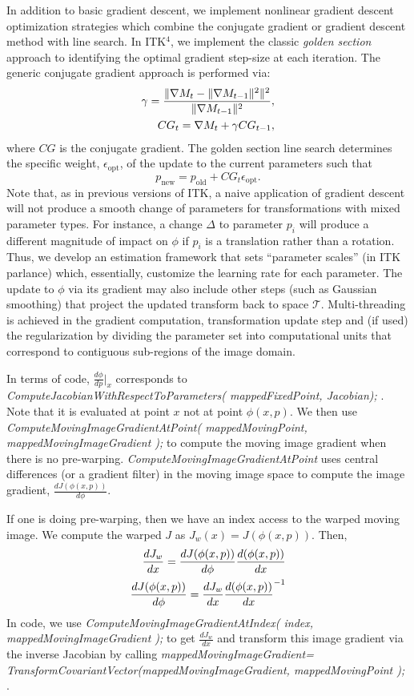 \documentclass{frontiersSCNS}
\begin{document}
In addition to basic gradient descent, we implement nonlinear gradient
descent optimization strategies which combine the conjugate gradient
or gradient descent method with line search.  In ITK$^4$, we implement the classic {\em
  golden section} approach to identifying the optimal gradient
step-size at each iteration.  The generic conjugate gradient approach
is performed via: 
\begin{align}
\gamma=\frac{\|\nabla M_{t}-\|\nabla M_{t-1}\|^2\|^2}{\|\nabla
  M_{t-1}\|^2}, \\ \notag
CG_t = \nabla M_t + \gamma CG_{t-1},
\end{align}
where $CG$ is the conjugate gradient.  The golden section line search
determines the specific weight, $\epsilon_\text{opt}$, of the update to the current parameters
such that 
$$ 
p_{\text{new}}=p_{\text{old}}+CG_t \epsilon_\text{opt}.
$$
Note that, as in previous versions of
ITK, a naive application of gradient descent will not produce a smooth
change of parameters for transformations with mixed parameter types.
For instance, a change $\Delta$ to parameter $p_i$ will produce a
different magnitude of impact on $\phi$ if $p_i$ is a translation rather than a
rotation.  Thus, we develop an estimation framework that sets
``parameter scales'' (in ITK parlance) which, essentially, customize
the learning rate for each parameter.  The update to
$\phi$ via its gradient may also include other steps (such as Gaussian
smoothing) that project the updated transform back to space
$\mathcal{T}$.  Multi-threading is achieved in the gradient computation, transformation update
step and (if used) the regularization by dividing the parameter set
into computational units that correspond to contiguous sub-regions of the image domain.

In terms of code, $\frac{d\phi}{dp}|_x$ corresponds to {\em
ComputeJacobianWithRespectToParameters( mappedFixedPoint, Jacobian);
}.  Note that it is evaluated at point $x$ not at point $\phi(x,p)$.  We
then use {\em
ComputeMovingImageGradientAtPoint( mappedMovingPoint,
mappedMovingImageGradient );} to compute the moving image gradient
when there is no pre-warping.  {\em ComputeMovingImageGradientAtPoint} uses central
differences (or a gradient filter) in the moving image space to
compute the image gradient, $\frac{dJ(\phi(x,p))}{d\phi}$.

 If one is doing pre-warping, then we have an index access to the
 warped moving image.  We compute the warped $J$ as
 $J_w(x)=J(\phi(x,p))$.  Then,
\begin{eqnarray}
\frac{dJ_w}{dx}=\frac{dJ(\phi(x,p))}{d\phi}\frac{d(\phi(x,p))}{dx} \\ \notag
\frac{dJ(\phi(x,p))}{d\phi}=\frac{dJ_w}{dx}{\frac{d(\phi(x,p))}{dx}}^{-1} 
\end{eqnarray}
In code, we use {\em ComputeMovingImageGradientAtIndex( index,
mappedMovingImageGradient );} to get $\frac{dJ_w}{dx}$ and transform
this image gradient via the inverse Jacobian by calling 
{\em mappedMovingImageGradient=
TransformCovariantVector(mappedMovingImageGradient, mappedMovingPoint ); }.
\end{document}
